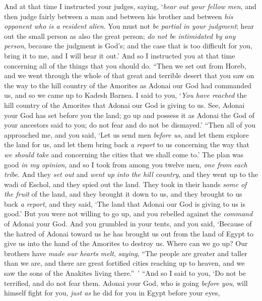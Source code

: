 \begin{biblechapter}
\verse And at that time I instructed your judges, saying, ‘\textit{hear out your fellow men}, and then judge fairly between a man and between his brother and between \textit{his opponent who is a resident alien}.
\verse You must not \textit{be partial} \textit{in your judgment};  hear out the small person as also the great person; \textit{do not be intimidated by any person}, because the judgment is God’s; and the case that is too difficult for you, bring it to me, and I will hear it out.’
\verse And so I instructed you at that time concerning all of the things that you should do.
\verse “Then we set out from Horeb, and we went through the whole of that great and terrible desert that you saw on the way to the hill country of the Amorites as Adonai our God had commanded us, and so we came up to Kadesh Barnea.
\verse I said to you, ‘\textit{You have reached} the hill country of the Amorites that Adonai our God is giving to us.
\verse See, Adonai your God has set before you the land; go up and possess it as Adonai the God of your ancestors said to you; do not fear and do not be dismayed.’
\verse “Then all of you approached me, and you said, ‘Let us send men \textit{before us}, and let them explore the land for us, and let them bring back \textit{a report} to us concerning the way that \textit{we should take} and concerning the cities that we shall come to.’
\verse The plan was good \textit{in my opinion}, and so I took from among you twelve men, \textit{one from each tribe}.
\verse And they \textit{set out} and \textit{went up into the hill country}, and they went up to the wadi of Eschol, and they spied out the land.
\verse They took in their hands \textit{some of the fruit} of the land, and they brought it down to us, and they brought to us back \textit{a report}, and they said, ‘The land that Adonai our God is giving to us is good.’
\verse But you were not willing to go up, and you rebelled against the \textit{command} of Adonai your God.
\verse And you grumbled in your tents, and you said, ‘Because of the hatred of Adonai toward us he has brought us out from the land of Egypt to give us into the hand of the Amorites to destroy us.
\verse Where can we go up? Our brothers have \textit{made our hearts melt}, \textit{saying}, “The people are greater and taller than we are, and there are great fortified cities reaching up to heaven, and we saw the sons of the Anakites living there.” ’
\verse “And so I said to you, ‘Do not be terrified, and do not fear them.
\verse Adonai your God, who is going \textit{before you}, will himself fight for you, \textit{just as} he did for you in Egypt before your eyes,

\end{biblechapter}
